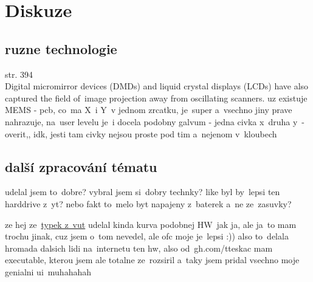 \chapter{Diskuze}
\section{ruzne technologie}
\cite{scanning-handbook} str. 394 \\
Digital micromirror devices (DMDs) and
liquid crystal displays (LCDs) have also captured the field of~image projection away from
oscillating scanners.
uz existuje MEMS \cite{mems-review}- pcb, co~ma X~i Y~v jednom zrcatku, je~super a~vsechno jiny prave nahrazuje, na~user levelu je~i docela podobny galvum - jedna civka x~druha y~- overit,, idk, jesti tam civky nejsou proste pod tim a~nejenom v~kloubech



\section{další zpracování tématu}
udelal jsem to~dobre? vybral jsem si~dobry technky?
like byl by~lepsi ten harddrive z~yt?
nebo fakt to~melo byt napajeny z~baterek a~ne ze~zasuvky?

ze hej ze~\href{https://dspace.vutbr.cz/bitstream/handle/11012/38621/final-thesis.pdf?sequence=-1}{typek z~vut} udelal kinda kurva podobnej HW~jak ja, ale ja~to mam trochu jinak, cuz jsem o~tom nevedel, ale ofc moje je~lepsi :))
also to~delala hromada dalsich lidi na~internetu ten hw, also od~gh.com/tteskac mam executable, kterou jsem ale totalne ze~rozsiril a~taky jsem pridal vsechno moje genialni ui~muhahahah


